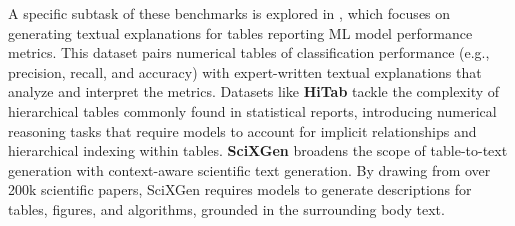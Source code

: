 % 
A specific subtask of these benchmarks is explored in %
\citet{ampomah-etal-2022-generating}, which focuses on generating textual explanations for tables reporting ML model performance metrics. This dataset pairs numerical tables of classification performance (e.g., precision, recall, and accuracy) with expert-written textual explanations that analyze and interpret the metrics. %
%
%
Datasets like %
\textbf{HiTab} \citep{cheng-etal-2022-hitab} %
tackle the complexity of hierarchical tables commonly found in statistical reports, introducing numerical reasoning tasks that require models to account for implicit relationships and hierarchical indexing within tables.
% 
\textbf{SciXGen} \citep{chen-etal-2021-scixgen-scientific} broadens the scope of table-to-text generation with context-aware scientific text generation. By drawing from over 200k %
scientific papers, SciXGen requires models to generate descriptions for tables, figures, and algorithms, grounded in the surrounding body text. %


